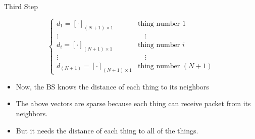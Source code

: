 \documentclass{beamer}
\begin{document}
\begin{frame}[t]{Third Step} %

\begin{equation}
        \left\{ \begin{array}{ll}
    		d_{1}=[\cdot]_{(N+1)\times1}     & \textrm{thing number $1$}\\
    	    \vdots                            &\quad \vdots \\
    		d_{i}=[\cdot]_{(N+1)\times1}   & \textrm{thing number $i$}\\
    	    \vdots                            &\quad \vdots \\    		d_{(N+1)}=[\cdot]_{(N+1)\times1}   & \textrm{thing number $(N+1)$}
        \end{array} \right.
\end{equation}

\begin{itemize}

\item Now, the BS knows the distance of each thing to its neighbors

\item The above vectors are sparse because each thing can receive packet from its neighbors.

\item But it needs the distance of each thing to all of the things.
\end{itemize}
\end{frame}
\end{document}
